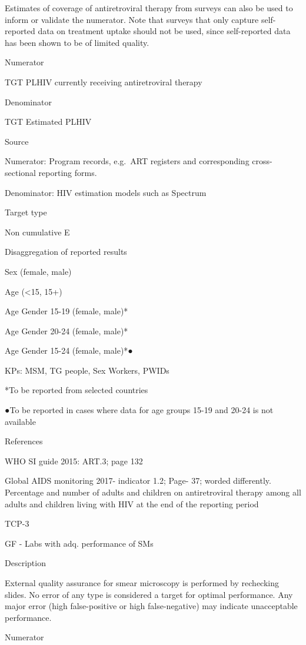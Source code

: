 \documentclass[]{book}
\begin{document}
Estimates of coverage of antiretroviral therapy from surveys can also be used to inform or validate the numerator. Note that surveys that only capture self-reported data on treatment uptake should not be used, since self-reported data has been shown to be of limited quality.

Numerator

TGT PLHIV currently receiving antiretroviral therapy

Denominator

TGT Estimated PLHIV

Source

Numerator: Program records, e.g.~ART registers and corresponding cross-sectional reporting forms.

Denominator: HIV estimation models such as Spectrum

Target type

Non cumulative E

Disaggregation of reported results

Sex (female, male)

Age (\textless{}15, 15+)

Age \textbar{} Gender 15-19 (female, male)*

Age \textbar{} Gender 20-24 (female, male)*

Age \textbar{} Gender 15-24 (female, male)*●

KPs: MSM, TG people, Sex Workers, PWIDs

*To be reported from selected countries

●To be reported in cases where data for age groups 15-19 and 20-24 is not available

References

WHO SI guide 2015: ART.3; page 132

Global AIDS monitoring 2017- indicator 1.2; Page- 37; worded differently.
Percentage and number of adults and children on antiretroviral therapy among all adults and children living with HIV at the end of the reporting period

TCP-3

GF - Labs with adq. performance of SMs

Description

External quality assurance for smear microscopy is performed by rechecking slides. No error of any type is considered a target for optimal performance. Any major error (high false-positive or high false-negative) may indicate unacceptable performance.

Numerator
\end{document}
